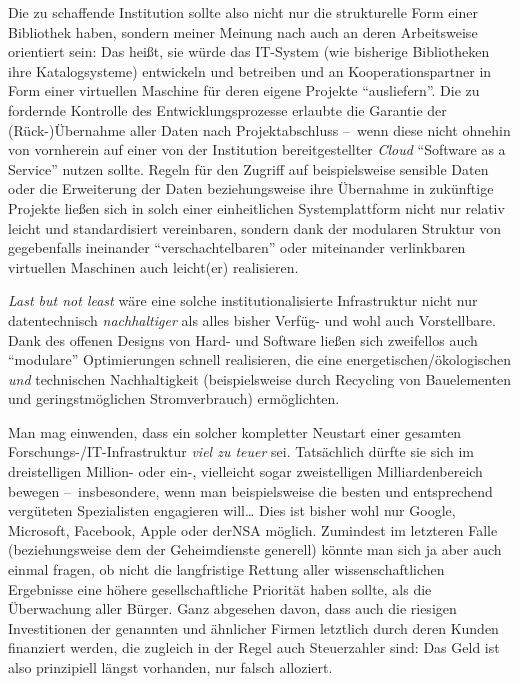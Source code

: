 \documentclass[a4paper,
fontsize=11pt,
oneside,
numbers=noperiodatend,
parskip=half-,
bibliography=totoc,
final
]{scrartcl}
\begin{document}
Die zu schaffende Institution sollte also nicht nur die strukturelle
Form einer Bibliothek haben, sondern meiner Meinung nach auch an deren
Arbeitsweise orientiert sein: Das heißt, sie würde das IT-System (wie
bisherige Bibliotheken ihre Katalogsysteme) entwickeln und betreiben und
an Kooperationspartner in Form einer virtuellen Maschine für deren
eigene Projekte \enquote{ausliefern}. Die zu fordernde Kontrolle des
Entwicklungsprozesse erlaubte die Garantie der (Rück-)Übernahme aller
Daten nach Projektabschluss --~wenn diese nicht ohnehin von vornherein
auf einer von der Institution bereitgestellter \emph{Cloud}
\enquote{Software as a Service} nutzen sollte. Regeln für den Zugriff
auf beispielsweise sensible Daten oder die Erweiterung der Daten
beziehungsweise ihre Übernahme in zukünftige Projekte ließen sich in
solch einer einheitlichen Systemplattform nicht nur relativ leicht und
standardisiert vereinbaren, sondern dank der modularen Struktur von
gegebenfalls ineinander \enquote{verschachtelbaren} oder miteinander
verlinkbaren virtuellen Maschinen auch leicht(er) realisieren.

\emph{Last but not least} wäre eine solche institutionalisierte
Infrastruktur nicht nur datentechnisch \emph{nachhaltiger} als alles
bisher Verfüg- und wohl auch Vorstellbare. Dank des offenen Designs von
Hard- und Software ließen sich zweifellos auch \enquote{modulare}
Optimierungen schnell realisieren, die eine energetischen/ökologischen
\emph{und} technischen Nachhaltigkeit (beispielsweise durch Recycling
von Bauelementen und geringstmöglichen Stromverbrauch) ermöglichten.

Man mag einwenden, dass ein solcher kompletter Neustart einer gesamten
Forschungs-/IT-Infrastruktur \emph{viel zu teuer} sei. Tatsächlich
dürfte sie sich im dreistelligen Million- oder ein-, vielleicht sogar
zweistelligen Milliardenbereich bewegen --~insbesondere, wenn man
beispielsweise die besten und entsprechend vergüteten Spezialisten
engagieren will\ldots{} Dies ist bisher wohl nur Google, Microsoft,
Facebook, Apple oder derNSA möglich. Zumindest im letzteren Falle
(beziehungsweise dem der Geheimdienste generell) könnte man sich ja aber
auch einmal fragen, ob nicht die langfristige Rettung aller
wissenschaftlichen Ergebnisse eine höhere gesellschaftliche Priorität
haben sollte, als die Überwachung aller Bürger. Ganz abgesehen davon,
dass auch die riesigen Investitionen der genannten und ähnlicher Firmen
letztlich durch deren Kunden finanziert werden, die zugleich in der
Regel auch Steuerzahler sind: Das Geld ist also prinzipiell längst
vorhanden, nur falsch alloziert.
\end{document}

